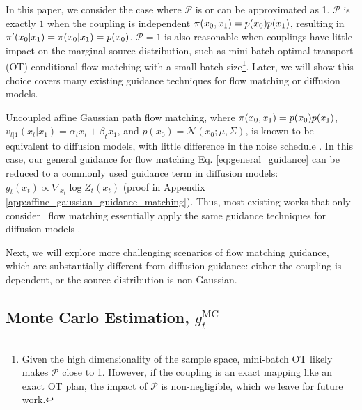 In this paper, we consider the case where $\mathcal{P}$ is or can be approximated as 1. $\mathcal{P}$ is exactly $1$ when the coupling is independent $\pi(x_0,x_1)=p(x_0)p(x_1)$, resulting in $\pi'(x_0|x_1)=\pi(x_0|x_1) = p(x_0)$. $\mathcal{P}=1$ is also reasonable when couplings have little impact on the marginal source distribution, such as mini-batch optimal transport (OT) conditional flow matching \citep{tong_improving_2024} with a small batch size\footnote{Given the high dimensionality of the sample space, mini-batch OT likely makes $\mathcal{P}$ close to 1. However, if the coupling is an exact mapping like an exact OT plan, the impact of $\mathcal{P}$ is non-negligible, which we leave for future work.}.
Later, we will show this choice covers many existing guidance techniques for flow matching or diffusion models.


Uncoupled affine Gaussian path flow matching, where $\pi(x_0,x_1)=p(x_0)p(x_1)$, $v_{t|1}(x_t|x_1)=\alpha_t x_t + \beta_t x_1$, and $p(x_0)=\mathcal{N}(x_0;\mu,\Sigma)$, is known to be equivalent to diffusion models, with little difference in the noise schedule \citep{zheng_guided_2023,ma_sit_2024}. In this case, our general guidance for flow matching Eq. \eqref{eq:general_guidance} can be reduced to a commonly used guidance term in diffusion models:
$
    g_t(x_t)\propto \nabla_{x_t} \log Z_t(x_t)\nonumber
$
(proof in Appendix \ref{app:affine_gaussian_guidance_matching}).
Thus, most existing works that only consider \diffusionpath~flow matching essentially apply the same guidance techniques for diffusion models \citep{dhariwal_diffusion_2021,song_loss-guided_2023,chung_diffusion_2024}.

Next, we will explore more challenging scenarios of flow matching guidance, which are substantially different from diffusion guidance: either the coupling is dependent, or the source distribution is non-Gaussian. 

\subsection{Monte Carlo Estimation, $g_t^{\text{MC}}$}\label{sec:g_mc}



